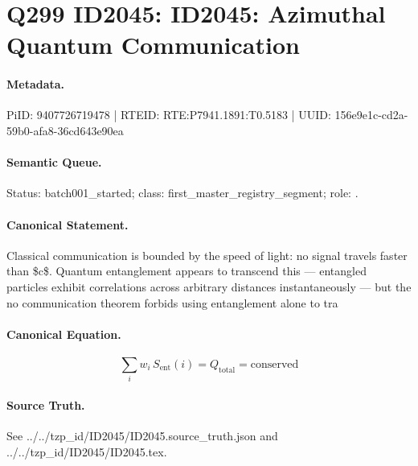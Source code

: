 \section*{Q299 ID2045: ID2045: Azimuthal Quantum Communication}
\paragraph{Metadata.}
PiID: 9407726719478 | RTEID: RTE:P7941.1891:T0.5183 | UUID: 156e9e1c-cd2a-59b0-afa8-36cd643e90ea

\paragraph{Semantic Queue.}
Status: batch001\_started; class: first\_master\_registry\_segment; role: .

\paragraph{Canonical Statement.}
Classical communication is bounded by the speed of light: no signal travels faster than \$c\$. Quantum entanglement appears to transcend this — entangled particles exhibit correlations across arbitrary distances instantaneously — but the no communication theorem forbids using entanglement alone to tra

\paragraph{Canonical Equation.}
\[
\sum_i w_i\, S_\text{ent}(i) = Q_\text{total} = \text{conserved}
\]

\paragraph{Source Truth.}
See ../../tzp\_id/ID2045/ID2045.source\_truth.json and ../../tzp\_id/ID2045/ID2045.tex.
